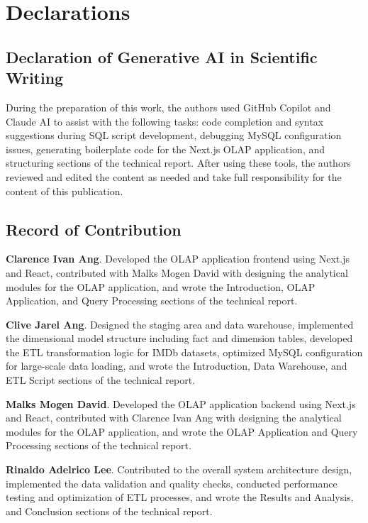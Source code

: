 \section{Declarations}

\subsection{Declaration of Generative AI in Scientific Writing}

During the preparation of this work, the authors used GitHub Copilot and Claude AI to assist with the following tasks: code completion and syntax suggestions during SQL script development, debugging MySQL configuration issues, generating boilerplate code for the Next.js OLAP application, and structuring sections of the technical report. After using these tools, the authors reviewed and edited the content as needed and take full responsibility for the content of this publication.

\subsection{Record of Contribution}

\textbf{Clarence Ivan Ang}.  Developed the OLAP application frontend using Next.js and React, contributed with Malks Mogen David with designing the analytical modules for the OLAP application, and wrote the Introduction, OLAP Application, and Query Processing sections of the technical report.

\textbf{Clive Jarel Ang}.  Designed the staging area and data warehouse, implemented the dimensional model structure including fact and dimension tables, developed the ETL transformation logic for IMDb datasets, optimized MySQL configuration for large-scale data loading, and wrote the Introduction, Data Warehouse, and ETL Script sections of the technical report.

\textbf{Malks Mogen David}.  Developed the OLAP application backend using Next.js and React, contributed with Clarence Ivan Ang with designing the analytical modules for the OLAP application, and wrote the OLAP Application and Query Processing sections of the technical report.

\textbf{Rinaldo Adelrico Lee}.  Contributed to the overall system architecture design, implemented the data validation and quality checks, conducted performance testing and optimization of ETL processes, and wrote the Results and Analysis, and Conclusion sections of the technical report.